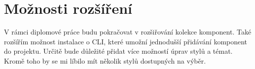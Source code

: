 
\chapter{Možnosti rozšíření}

V rámci diplomové práce budu pokračovat v rozšiřování kolekce komponent. Také rozšířím možnost instalace o CLI, které umožní
jednodušší přidávání komponent do projektu. Určitě bude důležité přidat více možností úprav stylů a témat. Kromě toho by se
mi líbilo mít několik stylů dostupných na výběr.


